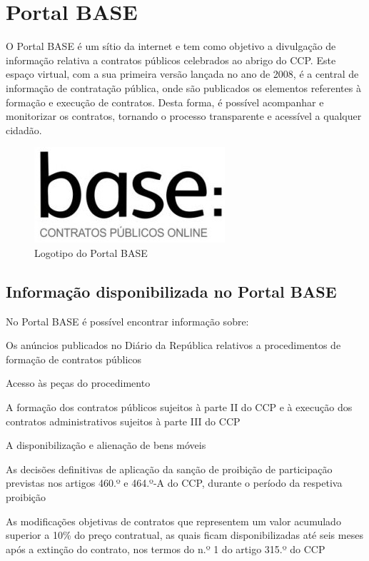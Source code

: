\section{Portal BASE}

O Portal BASE  é um sítio da internet e tem como objetivo a divulgação de informação relativa a contratos públicos celebrados ao abrigo do CCP.
Este espaço virtual, com a sua primeira versão lançada no ano de 2008, é a central de informação de contratação pública, onde são publicados os elementos referentes à formação e execução de contratos. 
Desta forma, é possível acompanhar e monitorizar os contratos, tornando o processo transparente e acessível a qualquer cidadão. 


\begin{figure}[H]
	\centering
	\includegraphics[scale=.5]{imagens/base.jpg}
	\caption{Logotipo do Portal BASE}
	\label{fig:base}
\end{figure}



\subsection{Informação disponibilizada no Portal BASE}

No Portal BASE é possível encontrar informação sobre:

\begin{my_enumerate}
	\item Os anúncios publicados no Diário da República relativos a procedimentos de formação de contratos públicos
	\item Acesso às peças do procedimento
	\item A formação dos contratos públicos sujeitos à parte II do CCP e à execução dos contratos administrativos sujeitos à parte III do CCP
	\item A disponibilização e alienação de bens móveis
	\item As decisões definitivas de aplicação da sanção de proibição de participação previstas nos artigos 460.º e 464.º-A do CCP, durante o período da respetiva proibição
	\item As modificações objetivas de contratos que representem um valor acumulado superior a 10\% do preço contratual, as quais ficam disponibilizadas até seis meses após a extinção do contrato, nos termos do n.º 1 do artigo 315.º do CCP
\end{my_enumerate}



